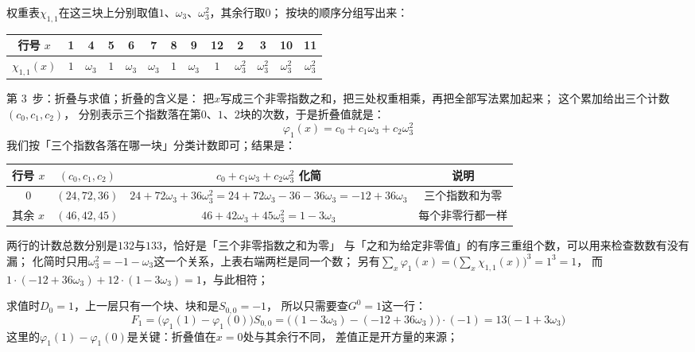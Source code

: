 \documentclass[UTF8,a4paper,11pt]{ctexart}
\begin{document}
权重表$\chi_{1,1}$在这三块上分别取值$1$、$\omega_3$、$\omega_3^2$，其余行取$0$；
按块的顺序分组写出来：
\begin{center}
\begin{tabular}{c|cccccccccccc}
\toprule
行号 $x$ & 1&4&5&6&7&8&9&12 & 2&3&10&11\\
\midrule
$\chi_{1,1}(x)$ & $1$&$\omega_3$&$1$&$\omega_3$&$\omega_3$&$1$&$\omega_3$&$1$
 & $\omega_3^2$&$\omega_3^2$&$\omega_3^2$&$\omega_3^2$\\
\bottomrule
\end{tabular}
\end{center}

第 3~步：折叠与求值；折叠的含义是：
把$x$写成三个非零指数之和，把三处权重相乘，再把全部写法累加起来；
这个累加给出三个计数$(c_0,c_1,c_2)$，
分别表示三个指数落在第$0$、$1$、$2$块的次数，于是折叠值就是：
\[
 \varphi_1(x)=c_0+c_1\omega_3+c_2\omega_3^2
\]
我们按「三个指数各落在哪一块」分类计数即可；结果是：
\begin{center}
{\small
\begin{tabular}{c|c|c|c}
\toprule
行号 $x$ & $(c_0,c_1,c_2)$ & $c_0+c_1\omega_3+c_2\omega_3^2$ 化简 & 说明 \\
\midrule
$0$ & $(24,72,36)$ & $24+72\omega_3+36\omega_3^2=24+72\omega_3-36-36\omega_3=-12+36\omega_3$ & 三个指数和为零 \\
其余 $x$ & $(46,42,45)$ & $46+42\omega_3+45\omega_3^2=1-3\omega_3$ & 每个非零行都一样 \\
\bottomrule
\end{tabular}} 
\end{center}
两行的计数总数分别是$132$与$133$，恰好是「三个非零指数之和为零」
与「之和为给定非零值」的有序三重组个数，可以用来检查数数有没有漏；
化简时只用$\omega_3^2=-1-\omega_3$这一个关系，上表右端两栏是同一个数；
另有$\sum_x\varphi_1(x)=\bigl(\sum_x\chi_{1,1}(x)\bigr)^3=1^3=1$，
而$1\cdot(-12+36\omega_3)+12\cdot(1-3\omega_3)=1$，与此相符；\par

求值时$D_0=1$，上一层只有一个块、块和是$S_{0,0}=-1$，
所以只需要查$G^0=1$这一行：
\[
 F_1=\bigl(\varphi_1(1)-\varphi_1(0)\bigr)S_{0,0}
 =\bigl((1-3\omega_3)-(-12+36\omega_3)\bigr)\cdot(-1)
 =13\bigl(-1+3\omega_3\bigr)
\]
这里的$\varphi_1(1)-\varphi_1(0)$是关键：折叠值在$x=0$处与其余行不同，
差值正是开方量的来源；\par
\end{document}

